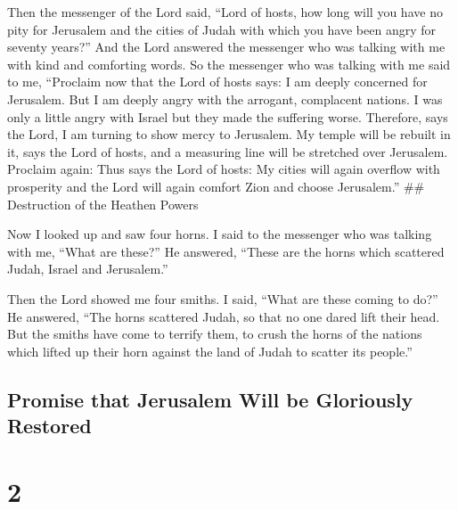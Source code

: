  Then the messenger of the Lord said, ``Lord of hosts, how
long will you have no pity for Jerusalem and the cities of Judah with
which you have been angry for seventy years?''  And the
Lord answered the messenger who was talking with me with kind and
comforting words.  So the messenger who was talking with me
said to me, ``Proclaim now that the Lord of hosts says: I am deeply
concerned for Jerusalem.  But I am deeply angry with the
arrogant, complacent nations. I was only a little angry with Israel but
they made the suffering worse.  Therefore, says the Lord, I
am turning to show mercy to Jerusalem. My temple will be rebuilt in it,
says the Lord of hosts, and a measuring line will be stretched over
Jerusalem.  Proclaim again: Thus says the Lord of hosts: My
cities will again overflow with prosperity and the Lord will again
comfort Zion and choose Jerusalem.'' \#\# Destruction of the Heathen
Powers

 Now I looked up and saw four horns.  I said
to the messenger who was talking with me, ``What are these?'' He
answered, ``These are the horns which scattered Judah, Israel and
Jerusalem.''

 Then the Lord showed me four smiths.  I said,
``What are these coming to do?'' He answered, ``The horns scattered
Judah, so that no one dared lift their head. But the smiths have come to
terrify them, to crush the horns of the nations which lifted up their
horn against the land of Judah to scatter its people.''

\hypertarget{promise-that-jerusalem-will-be-gloriously-restored}{%
\subsection{Promise that Jerusalem Will be Gloriously
Restored}\label{promise-that-jerusalem-will-be-gloriously-restored}}

\hypertarget{section-1}{%
\section{2}\label{section-1}}

